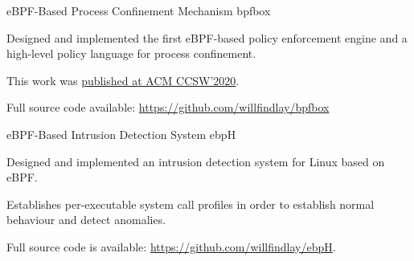 

\begin{cventries}

  \cventry
    {eBPF-Based Process Confinement Mechanism} %
    {bpfbox} %
    {} %
    {} %
    {
      \begin{cvitems} %
        \item Designed and implemented the first eBPF-based policy enforcement engine and a high-level policy language for process confinement.
        \item This work was \href{https://dl.acm.org/doi/10.1145/3411495.3421358}{published at ACM CCSW'2020}.
        \item Full source code available: \url{https://github.com/willfindlay/bpfbox}
      \end{cvitems}
    }

  \cventry
    {eBPF-Based Intrusion Detection System} %
    {ebpH} %
    {} %
    {} %
    {
      \begin{cvitems} %
        \item Designed and implemented an intrusion detection system for Linux based on eBPF.
        \item Establishes per-executable system call profiles in order to establish normal behaviour and detect anomalies.
        \item Full source code is available: \url{https://github.com/willfindlay/ebpH}.
      \end{cvitems}
    }

\end{cventries}
